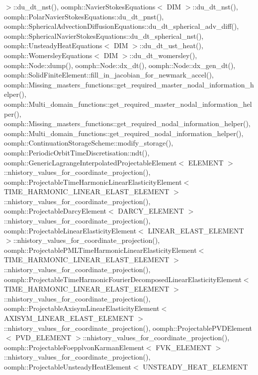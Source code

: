 $>$\+::du\+\_\+dt\+\_\+nst(), oomph\+::\+Navier\+Stokes\+Equations$<$ D\+I\+M $>$\+::du\+\_\+dt\+\_\+nst(), oomph\+::\+Polar\+Navier\+Stokes\+Equations\+::du\+\_\+dt\+\_\+pnst(), oomph\+::\+Spherical\+Advection\+Diffusion\+Equations\+::du\+\_\+dt\+\_\+spherical\+\_\+adv\+\_\+diff(), oomph\+::\+Spherical\+Navier\+Stokes\+Equations\+::du\+\_\+dt\+\_\+spherical\+\_\+nst(), oomph\+::\+Unsteady\+Heat\+Equations$<$ D\+I\+M $>$\+::du\+\_\+dt\+\_\+ust\+\_\+heat(), oomph\+::\+Womersley\+Equations$<$ D\+I\+M $>$\+::du\+\_\+dt\+\_\+womersley(), oomph\+::\+Node\+::dump(), oomph\+::\+Node\+::dx\+\_\+dt(), oomph\+::\+Node\+::dx\+\_\+gen\+\_\+dt(), oomph\+::\+Solid\+Finite\+Element\+::fill\+\_\+in\+\_\+jacobian\+\_\+for\+\_\+newmark\+\_\+accel(), oomph\+::\+Missing\+\_\+masters\+\_\+functions\+::get\+\_\+required\+\_\+master\+\_\+nodal\+\_\+information\+\_\+helper(), oomph\+::\+Multi\+\_\+domain\+\_\+functions\+::get\+\_\+required\+\_\+master\+\_\+nodal\+\_\+information\+\_\+helper(), oomph\+::\+Missing\+\_\+masters\+\_\+functions\+::get\+\_\+required\+\_\+nodal\+\_\+information\+\_\+helper(), oomph\+::\+Multi\+\_\+domain\+\_\+functions\+::get\+\_\+required\+\_\+nodal\+\_\+information\+\_\+helper(), oomph\+::\+Continuation\+Storage\+Scheme\+::modify\+\_\+storage(), oomph\+::\+Periodic\+Orbit\+Time\+Discretisation\+::ndt(), oomph\+::\+Generic\+Lagrange\+Interpolated\+Projectable\+Element$<$ E\+L\+E\+M\+E\+N\+T $>$\+::nhistory\+\_\+values\+\_\+for\+\_\+coordinate\+\_\+projection(), oomph\+::\+Projectable\+Time\+Harmonic\+Linear\+Elasticity\+Element$<$ T\+I\+M\+E\+\_\+\+H\+A\+R\+M\+O\+N\+I\+C\+\_\+\+L\+I\+N\+E\+A\+R\+\_\+\+E\+L\+A\+S\+T\+\_\+\+E\+L\+E\+M\+E\+N\+T $>$\+::nhistory\+\_\+values\+\_\+for\+\_\+coordinate\+\_\+projection(), oomph\+::\+Projectable\+Darcy\+Element$<$ D\+A\+R\+C\+Y\+\_\+\+E\+L\+E\+M\+E\+N\+T $>$\+::nhistory\+\_\+values\+\_\+for\+\_\+coordinate\+\_\+projection(), oomph\+::\+Projectable\+Linear\+Elasticity\+Element$<$ L\+I\+N\+E\+A\+R\+\_\+\+E\+L\+A\+S\+T\+\_\+\+E\+L\+E\+M\+E\+N\+T $>$\+::nhistory\+\_\+values\+\_\+for\+\_\+coordinate\+\_\+projection(), oomph\+::\+Projectable\+P\+M\+L\+Time\+Harmonic\+Linear\+Elasticity\+Element$<$ T\+I\+M\+E\+\_\+\+H\+A\+R\+M\+O\+N\+I\+C\+\_\+\+L\+I\+N\+E\+A\+R\+\_\+\+E\+L\+A\+S\+T\+\_\+\+E\+L\+E\+M\+E\+N\+T $>$\+::nhistory\+\_\+values\+\_\+for\+\_\+coordinate\+\_\+projection(), oomph\+::\+Projectable\+Time\+Harmonic\+Fourier\+Decomposed\+Linear\+Elasticity\+Element$<$ T\+I\+M\+E\+\_\+\+H\+A\+R\+M\+O\+N\+I\+C\+\_\+\+L\+I\+N\+E\+A\+R\+\_\+\+E\+L\+A\+S\+T\+\_\+\+E\+L\+E\+M\+E\+N\+T $>$\+::nhistory\+\_\+values\+\_\+for\+\_\+coordinate\+\_\+projection(), oomph\+::\+Projectable\+Axisym\+Linear\+Elasticity\+Element$<$ A\+X\+I\+S\+Y\+M\+\_\+\+L\+I\+N\+E\+A\+R\+\_\+\+E\+L\+A\+S\+T\+\_\+\+E\+L\+E\+M\+E\+N\+T $>$\+::nhistory\+\_\+values\+\_\+for\+\_\+coordinate\+\_\+projection(), oomph\+::\+Projectable\+P\+V\+D\+Element$<$ P\+V\+D\+\_\+\+E\+L\+E\+M\+E\+N\+T $>$\+::nhistory\+\_\+values\+\_\+for\+\_\+coordinate\+\_\+projection(), oomph\+::\+Projectable\+Foepplvon\+Karman\+Element$<$ F\+V\+K\+\_\+\+E\+L\+E\+M\+E\+N\+T $>$\+::nhistory\+\_\+values\+\_\+for\+\_\+coordinate\+\_\+projection(), oomph\+::\+Projectable\+Unsteady\+Heat\+Element$<$ U\+N\+S\+T\+E\+A\+D\+Y\+\_\+\+H\+E\+A\+T\+\_\+\+E\+L\+E\+M\+E\+N\+T 